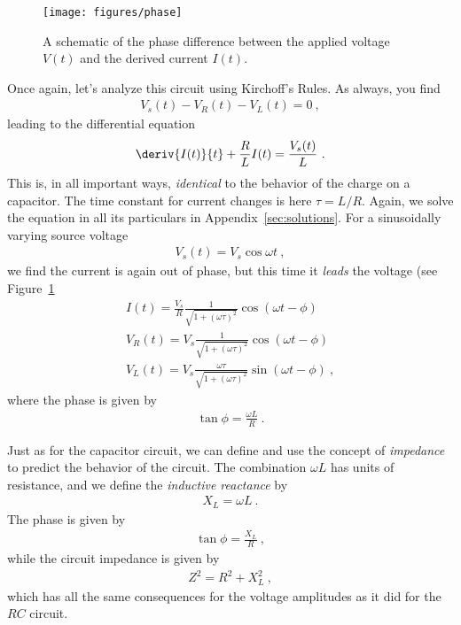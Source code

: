 \documentclass[12pt]{article}
\begin{document}
\begin{figure}
  \centering
  \texttt{[image: figures/phase]}
  \caption{A schematic of the phase difference between the applied
    voltage $V(t)$ and the derived current $I(t)$.}
  \label{fig:phase}
\end{figure}
Once again, let's analyze this circuit using Kirchoff's Rules.  As
always, you find
\begin{gather*}
  V_s(t) - V_R(t) - V_L(t) = 0\ ,
\end{gather*}
leading to the differential equation
\begin{gather*}
  \deriv{I(t)}{t} + \frac{R}{L} I(t) = \frac{V_s(t)}{L}\ .
\end{gather*}
This is, in all important ways, \textit{identical} to the behavior of
the charge on a capacitor.  The time constant for current changes is
here $\tau = L/R$.  Again, we solve the equation in all its
particulars in Appendix~\ref{sec:solutions}.  For a sinusoidally
varying source voltage
\begin{gather*}
  V_s(t) = V_s \cos\omega t\ ,
\end{gather*}
we find the current is again out of phase, but this time it
\textit{leads} the voltage (see Figure~\ref{fig:phase}
\begin{gather*}
  I(t) = \frac{V_s}{R} \frac{1}{\sqrt{1 + (\omega \tau)^2}}
  \cos(\omega t - \phi)\\
  V_R(t) = V_s \frac{1}{\sqrt{1 + (\omega \tau)^2}}
  \cos(\omega t - \phi)\\
  V_L(t) = V_s \frac{\omega \tau}{\sqrt{1 + (\omega \tau)^2}}
  \sin(\omega t - \phi)\ ,
\end{gather*}
where the phase is given by 
\begin{gather*}
  \tan \phi = \frac{\omega L}{R}\ .
\end{gather*}

Just as for the capacitor circuit, we can define and use the concept
of \textit{impedance} to predict the behavior of the circuit.  The
combination $\omega L$ has units of resistance, and we
define the \textit{inductive reactance} by
\begin{gather*}
  X_L = \omega L\ .
\end{gather*}
The phase is given by
\begin{gather*}
  \tan\phi = \frac{X_L}{R}\ ,
\end{gather*}
while the circuit impedance is given by
\begin{gather*}
  Z^2 = R^2 + X_L^2\ ,
\end{gather*}
which has all the same consequences for the voltage amplitudes as it
did for the $RC$ circuit.
\end{document}

